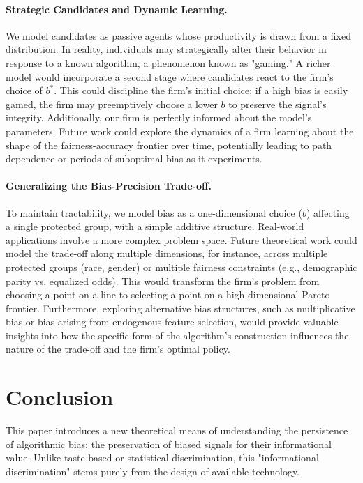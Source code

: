 \documentclass[12pt,a4paper]{article}
\theoremstyle{definition}
\theoremstyle{remark}
\begin{document}
\paragraph{Strategic Candidates and Dynamic Learning.}
We model candidates as passive agents whose productivity is drawn from a fixed distribution. In reality, individuals may strategically alter their behavior in response to a known algorithm, a phenomenon known as "gaming." A richer model would incorporate a second stage where candidates react to the firm's choice of $b^*$. This could discipline the firm's initial choice; if a high bias is easily gamed, the firm may preemptively choose a lower $b$ to preserve the signal's integrity. Additionally, our firm is perfectly informed about the model's parameters. Future work could explore the dynamics of a firm learning about the shape of the fairness-accuracy frontier over time, potentially leading to path dependence or periods of suboptimal bias as it experiments.

\paragraph{Generalizing the Bias-Precision Trade-off.}
To maintain tractability, we model bias as a one-dimensional choice ($b$) affecting a single protected group, with a simple additive structure. Real-world applications involve a more complex problem space. Future theoretical work could model the trade-off along multiple dimensions, for instance, across multiple protected groups (race, gender) or multiple fairness constraints (e.g., demographic parity vs. equalized odds). This would transform the firm's problem from choosing a point on a line to selecting a point on a high-dimensional Pareto frontier. Furthermore, exploring alternative bias structures, such as multiplicative bias or bias arising from endogenous feature selection, would provide valuable insights into how the specific form of the algorithm's construction influences the nature of the trade-off and the firm's optimal policy.

\section{Conclusion}

This paper introduces a new theoretical means of understanding the persistence of algorithmic bias: the preservation of biased signals for their informational value. Unlike taste-based or statistical discrimination, this "informational discrimination" stems purely from the design of available technology.
\end{document}
